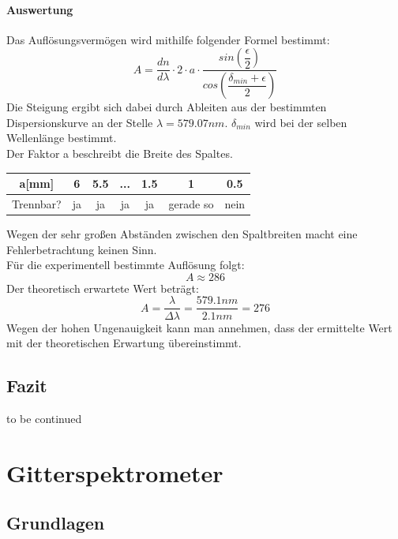 \documentclass[12pt,a4paper]{article}
\begin{document}
\paragraph{Auswertung}
Das Auflösungsvermögen wird mithilfe folgender Formel bestimmt:
\begin{equation}
A = \dfrac{dn}{d\lambda}\cdot 2\cdot a\cdot\dfrac{sin\left(\dfrac{\epsilon}{2}\right)}{cos\left(\dfrac{\delta_{min}+\epsilon}{2}\right)}
\end{equation}
Die Steigung ergibt sich dabei durch Ableiten aus der bestimmten Dispersionskurve an der Stelle $\lambda = 579.07 nm$. $\delta_{min}$ wird bei der selben Wellenlänge bestimmt.\\
Der Faktor a beschreibt die Breite des Spaltes.
\begin{table}
\begin{tabular}{|c|c|c|c|c|c|c|}
\hline
a[mm] & 6 & 5.5 & ... & 1.5 & 1 & 0.5\\
\hline
Trennbar? & ja & ja & ja & ja & gerade so & nein\\
\hline
\end{tabular}
\end{table}
Wegen der sehr großen Abständen zwischen den Spaltbreiten macht eine Fehlerbetrachtung keinen Sinn.\\
Für die experimentell bestimmte Auflösung folgt:
\begin{equation}
A \approx 286
\end{equation}
Der theoretisch erwartete Wert beträgt:
\begin{equation}
A = \dfrac{\lambda}{\Delta \lambda} = \dfrac{579.1 nm}{2.1 nm} = 276
\end{equation}
Wegen der hohen Ungenauigkeit kann man annehmen, dass der ermittelte Wert mit der theoretischen Erwartung übereinstimmt.



\subsection{Fazit}
to be continued






\newpage
\section{Gitterspektrometer}

\subsection{Grundlagen}
\end{document}
